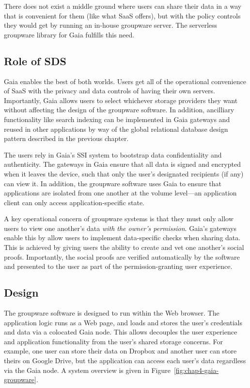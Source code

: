 There does not exist a middle ground where users can share their data in a way
that is convenient for them (like what SaaS offers), but with the policy
controls they would get by running an in-house groupware server.  The serverless
groupware library for Gaia fulfills this need.

\subsection{Role of SDS}

Gaia enables the best of both worlds.  Users get all of the
operational convenience of SaaS with the privacy and data controls of having
their own servers.  Importantly, Gaia allows users to select whichever storage
providers they want without affecting the design of the groupware software. 
In addition, ancilliary functionality like search indexing can be
implemented in Gaia gateways and reused in other applications by way of the
global relational database design pattern described in the previous chapter.

The users rely in Gaia's SSI system to bootstrap data confidentiality and
authenticity.  The gateways in Gaia ensure that all data is signed and encrypted
when it leaves the device, such that only the user's designated recipients (if
any) can view it.  In addition, the groupware software uses Gaia to ensure that
applications are isolated from one another at the volume level---an application
client can only access application-specific state.

A key operational concern of groupware systems is that they must only allow
users to view one another's data \emph{with the owner's permission}.  Gaia's
gateways enable this by allow users to implement data-specific checks when sharing
data.  This is achieved by giving users the ability to create and vet one
another's social proofs.  Importantly, the social proofs are verified
automatically by the software and presented to the user as part of the
permission-granting user experience.

\subsection{Design}

The groupware software is designed to run within the Web browser.  The
application logic runs as a Web page, and loads and stores the user's
credentials and data via a colocated Gaia node.  This allows decouples the
user experience and application functionality from the user's shared
storage concerns.  For example, one user can store their data on Dropbox and
another user can store theirs on Google Drive, but the application can access
each user's data regardless via the Gaia node.  A system overview is given
in Figure~\ref{fig:chap4-gaia-groupware}.

